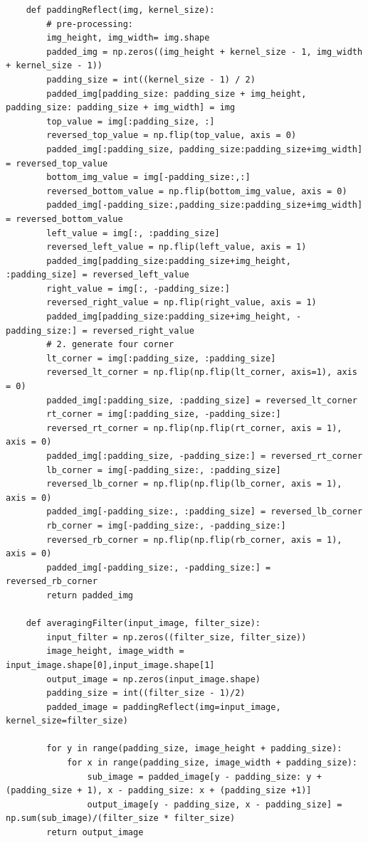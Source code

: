 \documentclass[12pt]{article}
\begin{document}
\begin{enumerate}[1]
\begin{enumerate}
\begin{lstlisting}
    def paddingReflect(img, kernel_size):
        # pre-processing:
        img_height, img_width= img.shape
        padded_img = np.zeros((img_height + kernel_size - 1, img_width + kernel_size - 1))
        padding_size = int((kernel_size - 1) / 2)
        padded_img[padding_size: padding_size + img_height, padding_size: padding_size + img_width] = img
        top_value = img[:padding_size, :]
        reversed_top_value = np.flip(top_value, axis = 0)
        padded_img[:padding_size, padding_size:padding_size+img_width] = reversed_top_value
        bottom_img_value = img[-padding_size:,:]
        reversed_bottom_value = np.flip(bottom_img_value, axis = 0)
        padded_img[-padding_size:,padding_size:padding_size+img_width] = reversed_bottom_value
        left_value = img[:, :padding_size]
        reversed_left_value = np.flip(left_value, axis = 1)
        padded_img[padding_size:padding_size+img_height, :padding_size] = reversed_left_value
        right_value = img[:, -padding_size:]
        reversed_right_value = np.flip(right_value, axis = 1)
        padded_img[padding_size:padding_size+img_height, -padding_size:] = reversed_right_value
        # 2. generate four corner
        lt_corner = img[:padding_size, :padding_size]
        reversed_lt_corner = np.flip(np.flip(lt_corner, axis=1), axis = 0)
        padded_img[:padding_size, :padding_size] = reversed_lt_corner
        rt_corner = img[:padding_size, -padding_size:]
        reversed_rt_corner = np.flip(np.flip(rt_corner, axis = 1), axis = 0)
        padded_img[:padding_size, -padding_size:] = reversed_rt_corner
        lb_corner = img[-padding_size:, :padding_size]
        reversed_lb_corner = np.flip(np.flip(lb_corner, axis = 1), axis = 0)
        padded_img[-padding_size:, :padding_size] = reversed_lb_corner
        rb_corner = img[-padding_size:, -padding_size:]
        reversed_rb_corner = np.flip(np.flip(rb_corner, axis = 1), axis = 0)
        padded_img[-padding_size:, -padding_size:] = reversed_rb_corner
        return padded_img

    def averagingFilter(input_image, filter_size):
        input_filter = np.zeros((filter_size, filter_size))
        image_height, image_width = input_image.shape[0],input_image.shape[1]
        output_image = np.zeros(input_image.shape)
        padding_size = int((filter_size - 1)/2)
        padded_image = paddingReflect(img=input_image, kernel_size=filter_size)

        for y in range(padding_size, image_height + padding_size):
            for x in range(padding_size, image_width + padding_size):
                sub_image = padded_image[y - padding_size: y + (padding_size + 1), x - padding_size: x + (padding_size +1)]
                output_image[y - padding_size, x - padding_size] = np.sum(sub_image)/(filter_size * filter_size)
        return output_image  


\end{lstlisting}
\end{enumerate}
\end{enumerate}
\end{document}
